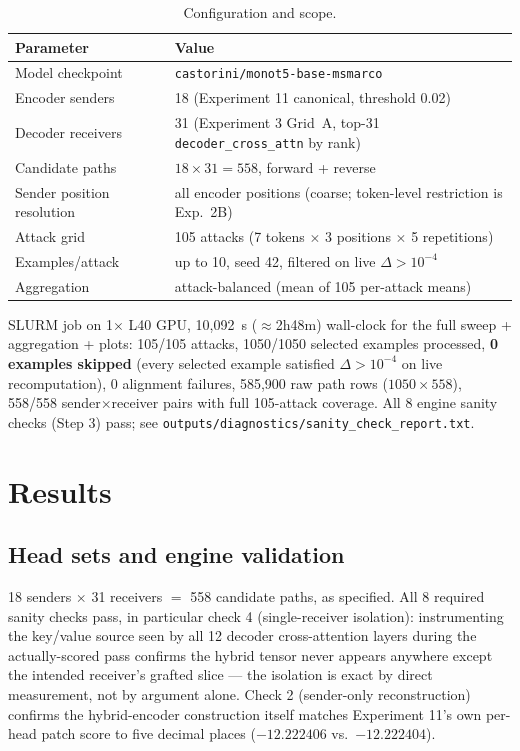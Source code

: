 \documentclass[11pt]{article}
\begin{document}
\begin{table}[H]
\centering
\caption{Configuration and scope.}
\begin{tabular}{ll}
\toprule
Parameter & Value \\
\midrule
Model checkpoint & \texttt{castorini/monot5-base-msmarco} \\
Encoder senders & 18 (Experiment 11 canonical, threshold 0.02) \\
Decoder receivers & 31 (Experiment 3 Grid~A, top-31 \texttt{decoder\_cross\_attn} by rank) \\
Candidate paths & $18 \times 31 = 558$, forward + reverse \\
Sender position resolution & all encoder positions (coarse; token-level restriction is Exp.\ 2B) \\
Attack grid & 105 attacks (7 tokens $\times$ 3 positions $\times$ 5 repetitions) \\
Examples/attack & up to 10, seed 42, filtered on live $\Delta > 10^{-4}$ \\
Aggregation & attack-balanced (mean of 105 per-attack means) \\
\bottomrule
\end{tabular}
\end{table}

\noindent SLURM job on 1$\times$ L40 GPU, 10{,}092~s ($\approx$2h48m)
wall-clock for the full sweep + aggregation + plots: 105/105 attacks,
1050/1050 selected examples processed, \textbf{0 examples skipped} (every
selected example satisfied $\Delta > 10^{-4}$ on live recomputation), 0
alignment failures, 585{,}900 raw path rows ($1050 \times 558$), 558/558
sender$\times$receiver pairs with full 105-attack coverage. All 8 engine
sanity checks (Step 3) pass; see \texttt{outputs/diagnostics/sanity\_check\_report.txt}.

\section{Results}
\label{sec:results}

\subsection{Head sets and engine validation}

18 senders $\times$ 31 receivers $=$ 558 candidate paths, as specified.
All 8 required sanity checks pass, in particular check 4 (single-receiver
isolation): instrumenting the key/value source seen by all 12 decoder
cross-attention layers during the actually-scored pass confirms the hybrid
tensor never appears anywhere except the intended receiver's grafted slice —
the isolation is exact by direct measurement, not by argument alone. Check 2
(sender-only reconstruction) confirms the hybrid-encoder construction itself
matches Experiment 11's own per-head patch score to five decimal places
($-12.222406$ vs.\ $-12.222404$).
\end{document}
